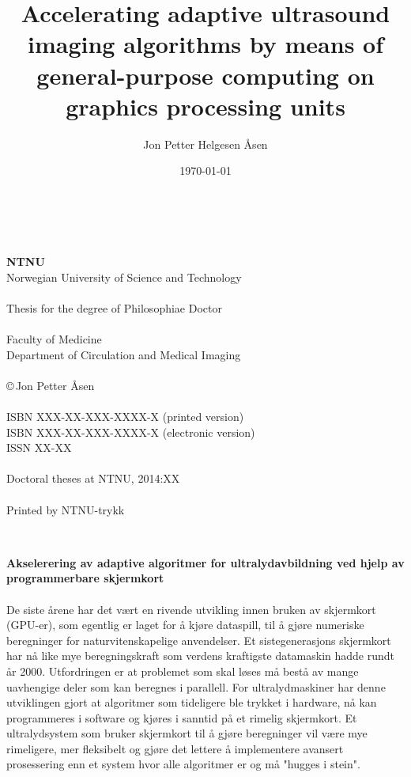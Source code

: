 \documentclass[10pt,b5paper,twoside]{book}
\author{Jon Petter Helgesen \AA{}sen}
\title{%
Accelerating adaptive ultrasound imaging algorithms by means of general-purpose computing on graphics processing units 
\vspace{0.5cm}}
\begin{document}
\date{\today}
\pagestyle{empty} \maketitle

\newpage%

\renewcommand{\thepage}{\roman{page}}%

~\\
\vspace{10.0cm}
~\\
{\bf NTNU}
\\
Norwegian University of Science and Technology\\
\\
Thesis for the degree of Philosophiae Doctor\\
\\
Faculty of Medicine\\
Department of Circulation and Medical Imaging\\
\\
\copyright\,Jon Petter \AA{}sen\\
\\
ISBN XXX-XX-XXX-XXXX-X (printed version)\\
ISBN XXX-XX-XXX-XXXX-X (electronic version)\\
ISSN XX-XX\\
\\
Doctoral theses at NTNU, 2014:XX\\
\\
Printed by NTNU-trykk

~\\
\newpage


\noindent\large 
\textbf{Akselerering av adaptive algoritmer for ultralydavbildning ved hjelp av programmerbare skjermkort}
\\\\%
\normalsize
De siste årene har det vært en rivende utvikling innen bruken av skjermkort (GPU-er), som egentlig er laget for å kjøre dataspill, til å gjøre numeriske beregninger for naturvitenskapelige anvendelser. Et sistegenerasjons skjermkort har nå like mye beregningskraft som verdens kraftigste datamaskin hadde rundt år 2000. Utfordringen er at problemet som skal løses må bestå av mange uavhengige deler som kan beregnes i parallell.  For ultralydmaskiner har denne utviklingen gjort at algoritmer som tideligere ble trykket i hardware, nå kan programmeres i software og kjøres i sanntid på et rimelig skjermkort. Et ultralydsystem som bruker skjermkort til å gjøre beregninger vil være mye rimeligere, mer fleksibelt og gjøre det lettere å implementere avansert prosessering enn et system hvor alle algoritmer er og må "hugges i stein".
\end{document}
